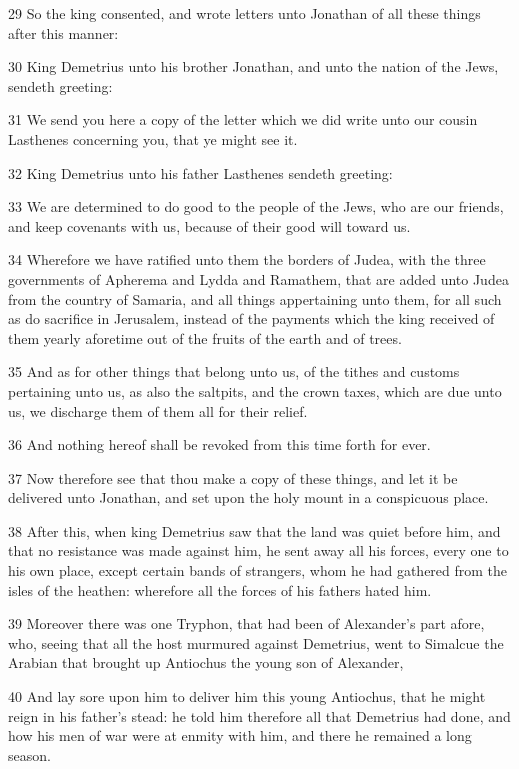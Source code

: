 \par 29 So the king consented, and wrote letters unto Jonathan of all these things after this manner:
\par 30 King Demetrius unto his brother Jonathan, and unto the nation of the Jews, sendeth greeting:
\par 31 We send you here a copy of the letter which we did write unto our cousin Lasthenes concerning you, that ye might see it.
\par 32 King Demetrius unto his father Lasthenes sendeth greeting:
\par 33 We are determined to do good to the people of the Jews, who are our friends, and keep covenants with us, because of their good will toward us.
\par 34 Wherefore we have ratified unto them the borders of Judea, with the three governments of Apherema and Lydda and Ramathem, that are added unto Judea from the country of Samaria, and all things appertaining unto them, for all such as do sacrifice in Jerusalem, instead of the payments which the king received of them yearly aforetime out of the fruits of the earth and of trees.
\par 35 And as for other things that belong unto us, of the tithes and customs pertaining unto us, as also the saltpits, and the crown taxes, which are due unto us, we discharge them of them all for their relief.
\par 36 And nothing hereof shall be revoked from this time forth for ever.
\par 37 Now therefore see that thou make a copy of these things, and let it be delivered unto Jonathan, and set upon the holy mount in a conspicuous place.
\par 38 After this, when king Demetrius saw that the land was quiet before him, and that no resistance was made against him, he sent away all his forces, every one to his own place, except certain bands of strangers, whom he had gathered from the isles of the heathen: wherefore all the forces of his fathers hated him.
\par 39 Moreover there was one Tryphon, that had been of Alexander's part afore, who, seeing that all the host murmured against Demetrius, went to Simalcue the Arabian that brought up Antiochus the young son of Alexander,
\par 40 And lay sore upon him to deliver him this young Antiochus, that he might reign in his father's stead: he told him therefore all that Demetrius had done, and how his men of war were at enmity with him, and there he remained a long season.
